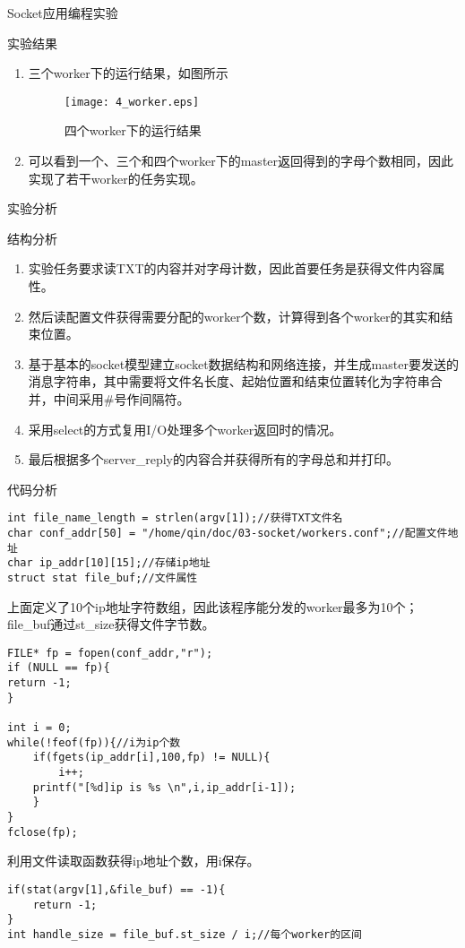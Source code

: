 \documentclass{article} %
\begin{document}
\begin{section}{Socket应用编程实验}
\begin{subsection}{实验结果}
\begin{enumerate}[1)]
\begin{figure}[!htb]
				\end{figure}
				\item 三个worker下的运行结果，如图所示\\
				\begin{figure}[htb]	
					\centering
					\texttt{[image: 4\_worker.eps]}	
					\caption{四个worker下的运行结果}
				\end{figure}
				\item 可以看到一个、三个和四个worker下的master返回得到的字母个数相同，因此实现了若干worker的任务实现。
			\end{enumerate}
		\end{subsection}
		\begin{subsection}{实验分析}
			\begin{subsubsection}{结构分析}
				\begin{enumerate}[1)]
					\item 实验任务要求读TXT的内容并对字母计数，因此首要任务是获得文件内容属性。
					\item 然后读配置文件获得需要分配的worker个数，计算得到各个worker的其实和结束位置。
					\item 基于基本的socket模型建立socket数据结构和网络连接，并生成master要发送的消息字符串，其中需要将文件名长度、起始位置和结束位置转化为字符串合并，中间采用\#号作间隔符。
					\item 采用select的方式复用I/O处理多个worker返回时的情况。
					\item 最后根据多个server\_reply的内容合并获得所有的字母总和并打印。
				\end{enumerate}
			\end{subsubsection}
			\begin{subsubsection}{代码分析}
				\begin{lstlisting}[language={[ANSI]C}]
int file_name_length = strlen(argv[1]);//获得TXT文件名
char conf_addr[50] = "/home/qin/doc/03-socket/workers.conf";//配置文件地址
char ip_addr[10][15];//存储ip地址
struct stat file_buf;//文件属性
				\end{lstlisting}
				上面定义了10个ip地址字符数组，因此该程序能分发的worker最多为10个；file\_buf通过st\_size获得文件字节数。
				\begin{lstlisting}[language={[ANSI]C}]
FILE* fp = fopen(conf_addr,"r");
if (NULL == fp){
return -1;
}

int i = 0;
while(!feof(fp)){//i为ip个数
	if(fgets(ip_addr[i],100,fp) != NULL){        
		i++;
	printf("[%d]ip is %s \n",i,ip_addr[i-1]);
	}	    
}
fclose(fp);
				\end{lstlisting}
				利用文件读取函数获得ip地址个数，用i保存。
				\begin{lstlisting}[language={[ANSI]C}]
if(stat(argv[1],&file_buf) == -1){
	return -1;
}
int handle_size = file_buf.st_size / i;//每个worker的区间


\end{lstlisting}
\end{subsubsection}
\end{subsection}
\end{section}
\end{document}
